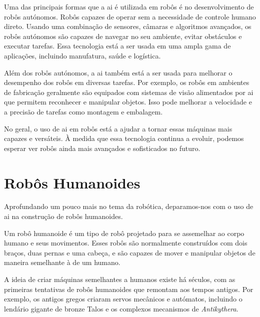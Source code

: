 \documentclass{report}
\begin{document}
Uma das principais formas que a \ac{ai} é utilizada em robôs é no desenvolvimento de robôs autónomos. Robôs capazes de operar sem a necessidade de controle humano direto. Usando uma combinação de sensores, câmaras e algoritmos avançados, os robôs autónomos são capazes de navegar no seu ambiente, evitar obstáculos e executar tarefas. Essa tecnologia está a ser usada em uma ampla gama de aplicações, incluindo manufatura, saúde e logística.

Além dos robôs autónomos, a \ac{ai} também está a ser usada para melhorar o desempenho dos robôs em diversas tarefas. Por exemplo, os robôs em ambientes de fabricação geralmente são equipados com sistemas de visão alimentados por \ac{ai} que permitem reconhecer e manipular objetos. Isso pode melhorar a velocidade e a precisão de tarefas como montagem e embalagem.

No geral, o uso de \ac{ai} em robôs está a ajudar a tornar essas máquinas mais capazes e versáteis. À medida que essa tecnologia continua a evoluir, podemos esperar ver robôs ainda mais avançados e sofisticados no futuro.

\section{Robôs Humanoides}
Aprofundando um pouco mais no tema da robótica, deparamos-nos com o uso de \ac{ai} na construção de robôs humanoides.

Um robô humanoide é um tipo de robô projetado para se assemelhar ao corpo humano e seus movimentos. Esses robôs são normalmente construídos com dois braços, duas pernas e uma cabeça, e são capazes de mover e manipular objetos de maneira semelhante à de um humano.

A ideia de criar máquinas semelhantes a humanos existe há séculos, com as primeiras tentativas de robôs humanoides que remontam aos tempos antigos. Por exemplo, os antigos gregos criaram servos mecânicos e autómatos, incluindo o lendário gigante de bronze Talos e os complexos mecanismos de \textit{Antikythera}.
\end{document}
